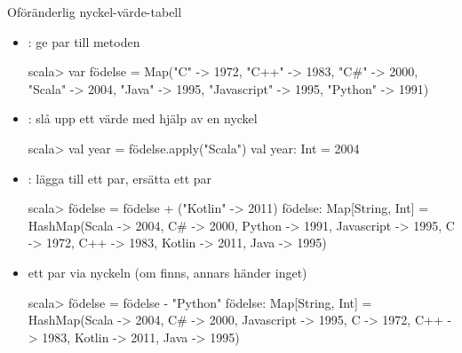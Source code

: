 \begin{Slide}{Oföränderlig nyckel-värde-tabell}
\setlength{\leftmargini}{1em}
\begin{itemize}
\item {}: ge par till metoden  
\begin{REPLsmall}
scala> var födelse = Map("C" -> 1972,  "C++" -> 1983, "C#" -> 2000,
  "Scala" -> 2004, "Java" -> 1995, "Javascript" -> 1995, "Python" -> 1991)
\end{REPLsmall}

\item {}: slå upp ett värde med hjälp av en nyckel
\begin{REPLsmall}
scala> val year = födelse.apply("Scala")
val year: Int = 2004
\end{REPLsmall}

\item {}: lägga till ett par, ersätta ett par
\begin{REPLsmall}
scala> födelse = födelse + ("Kotlin" -> 2011)
födelse: Map[String, Int] = HashMap(Scala -> 2004, C# -> 2000, Python -> 1991, 
Javascript -> 1995, C -> 1972, C++ -> 1983, Kotlin -> 2011, Java -> 1995)
\end{REPLsmall}

\item {} ett par via nyckeln (om finns, annars händer inget)
\begin{REPLsmall}
scala> födelse = födelse - "Python"
födelse: Map[String, Int] = HashMap(Scala -> 2004, C# -> 2000, 
Javascript -> 1995, C -> 1972, C++ -> 1983, Kotlin -> 2011, Java -> 1995)
\end{REPLsmall}
\end{itemize}
\end{Slide}


